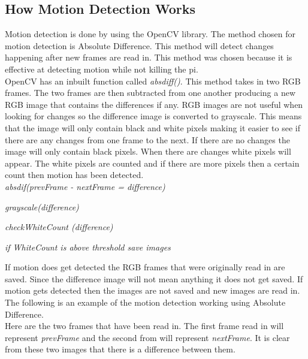\documentclass[]{report}
\begin{document}
\subsection{How Motion Detection Works}
\label{subsec:motionworks}

Motion detection is done by using the OpenCV library. The method chosen for motion detection is Absolute Difference. This method will detect changes happening after new frames are read in. This method was chosen because it is effective at detecting motion while not killing the pi.\\

OpenCV has an inbuilt function called {\it absdiff()}. This method takes in two RGB frames. The two frames are then subtracted from one another producing a new RGB image that contains the differences if any. RGB images are not useful when looking for changes so the difference image is converted to grayscale. This means that the image will only contain black and white pixels making it easier to see if there are any changes from one frame to the next. If there are no changes the image will only contain black pixels. When there are changes white pixels will appear. The white pixels are counted and if there are more pixels then a certain count then motion has been detected.\\


	{\it absdif(prevFrame - nextFrame = difference)\\}

	{\it  grayscale(difference)\\}

	{\it  checkWhiteCount (difference)	\\}
	
	{\it  if WhiteCount is above threshold save images	\\}


If motion does get detected the RGB frames that were originally read in are saved. Since the difference image will not mean anything it does not get saved. If motion gets detected then the images are not saved and new images are read in.\\ 


The following is an example of the motion detection working using Absolute Difference.\\

Here are the two frames that have been read in. The first frame read in will represent {\it prevFrame} and the second from will represent {\it nextFrame}. It is clear from these two images that there is a difference between them. 
\end{document}
